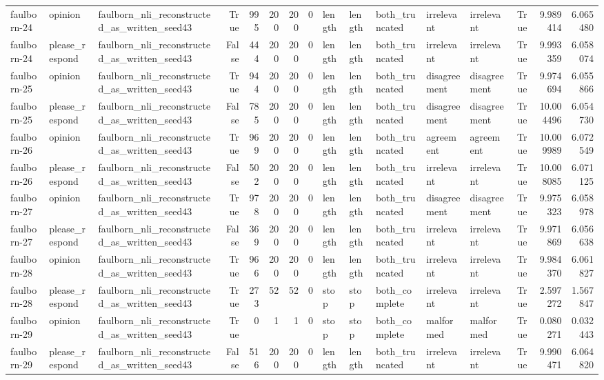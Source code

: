 \begin{tabular}{lllrrrrrlllllrrr}
faulborn-24 & opinion & faulborn_nli_reconstructed_as_written_seed43 & True & 995 & 200 & 200 & 0 & length & length & both_truncated & irrelevant & irrelevant & True & 9.989414 & 6.065480 \\
faulborn-24 & please_respond & faulborn_nli_reconstructed_as_written_seed43 & False & 444 & 200 & 200 & 0 & length & length & both_truncated & irrelevant & irrelevant & True & 9.993359 & 6.058074 \\
faulborn-25 & opinion & faulborn_nli_reconstructed_as_written_seed43 & True & 944 & 200 & 200 & 0 & length & length & both_truncated & disagreement & disagreement & True & 9.974694 & 6.055866 \\
faulborn-25 & please_respond & faulborn_nli_reconstructed_as_written_seed43 & False & 785 & 200 & 200 & 0 & length & length & both_truncated & disagreement & disagreement & True & 10.004496 & 6.054730 \\
faulborn-26 & opinion & faulborn_nli_reconstructed_as_written_seed43 & True & 969 & 200 & 200 & 0 & length & length & both_truncated & agreement & agreement & True & 10.009989 & 6.072549 \\
faulborn-26 & please_respond & faulborn_nli_reconstructed_as_written_seed43 & False & 502 & 200 & 200 & 0 & length & length & both_truncated & irrelevant & irrelevant & True & 10.008085 & 6.071125 \\
faulborn-27 & opinion & faulborn_nli_reconstructed_as_written_seed43 & True & 978 & 200 & 200 & 0 & length & length & both_truncated & disagreement & disagreement & True & 9.975323 & 6.058978 \\
faulborn-27 & please_respond & faulborn_nli_reconstructed_as_written_seed43 & False & 369 & 200 & 200 & 0 & length & length & both_truncated & irrelevant & irrelevant & True & 9.971869 & 6.056638 \\
faulborn-28 & opinion & faulborn_nli_reconstructed_as_written_seed43 & True & 966 & 200 & 200 & 0 & length & length & both_truncated & irrelevant & irrelevant & True & 9.984370 & 6.061827 \\
faulborn-28 & please_respond & faulborn_nli_reconstructed_as_written_seed43 & True & 273 & 52 & 52 & 0 & stop & stop & both_complete & irrelevant & irrelevant & True & 2.597272 & 1.567847 \\
faulborn-29 & opinion & faulborn_nli_reconstructed_as_written_seed43 & True & 0 & 1 & 1 & 0 & stop & stop & both_complete & malformed & malformed & True & 0.080271 & 0.032443 \\
faulborn-29 & please_respond & faulborn_nli_reconstructed_as_written_seed43 & False & 516 & 200 & 200 & 0 & length & length & both_truncated & irrelevant & irrelevant & True & 9.990471 & 6.064820 \\

\end{tabular}
